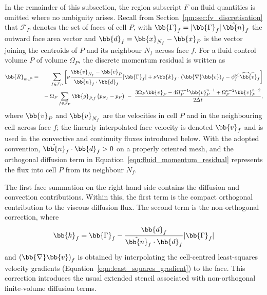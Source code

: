 In the remainder of this subsection, the region subscript $F$ on fluid quantities is omitted where no ambiguity arises.
Recall from Section~\ref{qm:sec:fv_discretisation} that $\mathcal{F}_P$ denotes the set of faces of cell $P$, with $\bb{\Gamma}_f = |\bb{\Gamma}_f|\, \hat{\bb{n}}_f$ the outward face area vector and $\bb{d}_f = \bb{x}_{N_f} - \bb{x}_P$ is the vector joining the centroids of $P$ and its neighbour $N_f$ across face $f$.
For a fluid control volume $P$ of volume $\Omega_P$, the discrete momentum residual is written as
\begin{eqnarray}
    \bb{R}_{m,P}
    &=&
    \sum_{f \in \mathcal{F}_P}
    \bigg[
       \nu
       \frac{\bb{v}_{N_f} - \bb{v}_{P}}
            {\hat{\bb{n}}_f \cdot \bb{d}_f}
       |\bb{\Gamma}_f|
       +
       \nu \bb{k}_f \cdot
       \left( \bb{\nabla} \bb{v} \right)_f
       -
       \phi^\mathrm{rel}_f
       \widetilde{\bb{v}}_f
    \bigg]
    \notag \\
    &&-\;
    \Omega_P \sum_{f \in \mathcal{F}_P} \bb{g}_{P,f} \left( p_{N_f} - p_{P} \right)
    \;-\;
    \frac{
    3 \Omega_{P} \bb{v}_{P}
    -
    4 \Omega_{P}^{n-1} \bb{v}_{P}^{n-1}
    +
    \Omega_{P}^{n-2} \bb{v}_{P}^{n-2}
    }
    {2\Delta t},
    \label{qm:eqn:fluid_momentum_residual}
\end{eqnarray}
where $\bb{v}_P$ and $\bb{v}_{N_f}$ are the velocities in cell $P$ and in the neighbouring cell across face $f$; the linearly interpolated face velocity is denoted $\bb{v}_f$ and is used in the convective and continuity fluxes introduced below.
With the adopted convention, $\hat{\bb{n}}_f \cdot \bb{d}_f > 0$ on a properly oriented mesh, and the orthogonal diffusion term in Equation~\eqref{eqn:fluid_momentum_residual} represents the flux into cell $P$ from its neighbour $N_f$.


The first face summation on the right-hand side contains the diffusion and convection contributions.
Within this, the first term is the compact orthogonal contribution to the viscous diffusion flux.
The second term is the non-orthogonal correction, where
\begin{equation}
    \bb{k}_f
    =
    \bb{\Gamma}_f
    -
    \frac{\bb{d}_f}
         {\hat{\bb{n}}_f \cdot \bb{d}_f}
    |\bb{\Gamma}_f|
    \label{qm:eqn:non_orthogonal_correction_vector}
\end{equation}
and $\left( \bb{\nabla} \bb{v} \right)_f$ is obtained by interpolating the cell-centred least-squares velocity gradients (Equation~\eqref{eqn:least_squares_gradient}) to the face.
This correction introduces the usual extended stencil associated with non-orthogonal
finite-volume diffusion terms.

